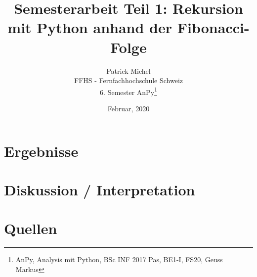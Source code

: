 \documentclass[12pt]{article}
\title{Semesterarbeit Teil 1: Rekursion mit Python anhand der Fibonacci-Folge}
\date{Februar, 2020}
\author{Patrick Michel\\
FFHS - Fernfachhochschule Schweiz\\
6. Semester AnPy\thanks{AnPy, Analysis mit Python, BSc INF 2017 Pas, BE1-I, FS20, Geuss Markus}
}
\begin{document}

\begin{titlepage}

\maketitle
\tableofcontents

\end{titlepage}



\newpage



\newpage



\newpage



\newpage

\section{Ergebnisse}
\blindtext

\section{Diskussion / Interpretation}
\blindtext

\section{Quellen}
\blindtext
\end{document}

